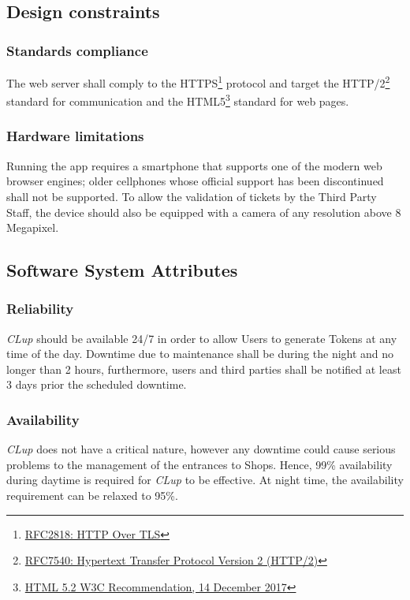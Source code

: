 \subsection{Design constraints}
\subsubsection{Standards compliance}
The web server shall comply to the HTTPS\footnote{\href{https://tools.ietf.org/html/rfc2818}{RFC2818: HTTP Over TLS}} protocol and target the HTTP/2\footnote{\href{https://tools.ietf.org/html/rfc7540}{RFC7540: Hypertext Transfer Protocol Version 2 (HTTP/2)}} standard for communication and the HTML5\footnote{\href{https://www.w3.org/TR/2017/REC-html52-20171214/}{HTML 5.2 W3C Recommendation, 14 December 2017}} standard for web pages.

\subsubsection{Hardware limitations}
Running the app requires a smartphone that supports one of the modern web browser engines; older cellphones whose official support has been discontinued shall not be supported.
To allow the validation of tickets by the Third Party Staff, the device should also be equipped with a camera of any resolution above 8 Megapixel.

\subsection{Software System Attributes}
\subsubsection{Reliability}
\textit{CLup} should be available 24/7 in order to allow Users to generate Tokens at any time of the day. Downtime due to maintenance shall be during the night and no longer than 2 hours, furthermore, users and third parties shall be notified at least 3 days prior the scheduled downtime.
\subsubsection{Availability}
\emph{CLup} does not have a critical nature, however any downtime could cause serious problems to the management of the entrances to Shops. Hence, 99\% availability during daytime is required for \emph{CLup} to be effective. At night time, the availability requirement can be relaxed to 95\%.
